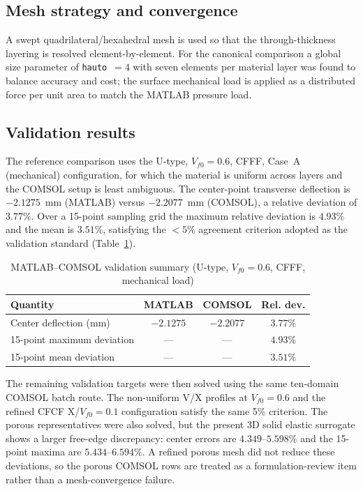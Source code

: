 \documentclass[11pt,a4paper]{article}
\begin{document}
\subsection{Mesh strategy and convergence}

A swept quadrilateral/hexahedral mesh is used so that the through-thickness layering is resolved element-by-element. For the canonical comparison a global size parameter of \texttt{hauto}~$=4$ with seven elements per material layer was found to balance accuracy and cost; the surface mechanical load is applied as a distributed force per unit area to match the MATLAB pressure load.

\subsection{Validation results}

The reference comparison uses the U-type, $V_{f0} = 0.6$, CFFF, Case~A (mechanical) configuration, for which the material is uniform across layers and the COMSOL setup is least ambiguous. The center-point transverse deflection is $-2.1275$~mm (MATLAB) versus $-2.2077$~mm (COMSOL), a relative deviation of $3.77\%$. Over a 15-point sampling grid the maximum relative deviation is $4.93\%$ and the mean is $3.51\%$, satisfying the $<5\%$ agreement criterion adopted as the validation standard (Table~\ref{tab:validation}).

\begin{table}[H]
\centering
\caption{MATLAB--COMSOL validation summary (U-type, $V_{f0}=0.6$, CFFF, mechanical load)}
\label{tab:validation}
\begin{tabular}{lccc}
\toprule
\textbf{Quantity} & \textbf{MATLAB} & \textbf{COMSOL} & \textbf{Rel. dev.} \\
\midrule
Center deflection (mm) & $-2.1275$ & $-2.2077$ & $3.77\%$ \\
15-point maximum deviation & --- & --- & $4.93\%$ \\
15-point mean deviation & --- & --- & $3.51\%$ \\
\bottomrule
\end{tabular}
\end{table}

The remaining validation targets were then solved using the same ten-domain COMSOL batch route. The non-uniform V/X profiles at $V_{f0}=0.6$ and the refined CFCF X/$V_{f0}=0.1$ configuration satisfy the same 5\% criterion. The porous representatives were also solved, but the present 3D solid elastic surrogate shows a larger free-edge discrepancy: center errors are $4.349$--$5.598\%$ and the 15-point maxima are $5.434$--$6.594\%$. A refined porous mesh did not reduce these deviations, so the porous COMSOL rows are treated as a formulation-review item rather than a mesh-convergence failure.
\end{document}
